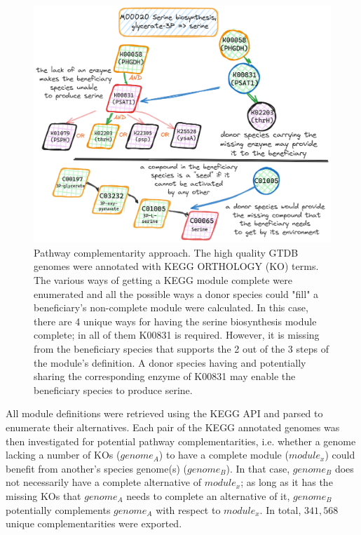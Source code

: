 \documentclass[sn-mathphys,Numbered]{sn-jnl}  %
\theoremstyle{thmstyleone}%
\theoremstyle{thmstyletwo}%
\theoremstyle{thmstylethree}%
\begin{document}
        \begin{figure}[h!]
            \includegraphics*[width=0.8\columnwidth]{figs/path_complem.png}
            \caption{
                Pathway complementarity approach. 
                The high quality GTDB genomes were annotated with KEGG ORTHOLOGY (KO) terms.
                The various ways of getting a KEGG module complete were enumerated and all the possible ways a donor species could "fill" a beneficiary's non-complete module were calculated.
                In this case, there are 4 unique ways for having the serine biosynthesis module complete; in all of them K00831 is required.
                However, it is missing from the beneficiary species that supports the 2 out of the 3 steps of the module's definition.
                A donor species having and potentially sharing the corresponding enzyme of K00831 may enable the beneficiary species to produce serine.
            }
            \label{fig:pathcompl}
        \end{figure}

        All module definitions were retrieved using the KEGG API and parsed to enumerate their alternatives.
        Each pair of the KEGG annotated genomes was then investigated for potential pathway complementarities, 
        i.e. whether a genome lacking a number of KOs ($genome_A$) to have a complete module ($module_x$) could benefit from another's species genome(s) ($genome_B$).
        In that case, $genome_B$ does not necessarily have a complete alternative of $module_x$; as long as it has the missing KOs that $genome_A$ needs to complete an alternative of it, $genome_B$ potentially complements $genome_A$ with respect to $module_x$.
        In total, $341,568$ unique complementarities were exported.
\end{document}
